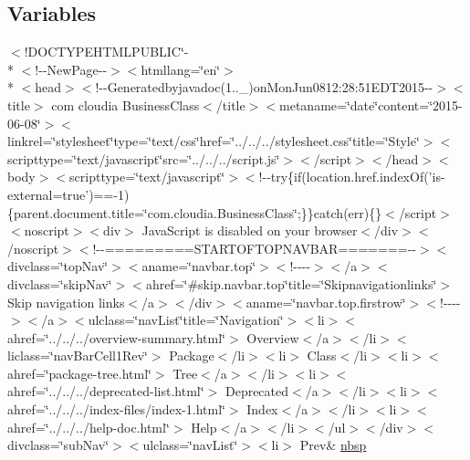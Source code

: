 \subsection*{Variables}
\begin{DoxyCompactItemize}
\item 
$<$!D\-O\-C\-T\-Y\-P\-E\-H\-T\-M\-L\-P\-U\-B\-L\-I\-C\char`\"{}-\/\\*
$<$!-\/-\/New\-Page-\/-\/$>$$<$htmllang=\char`\"{}en\char`\"{}$>$\\*
$<$head$>$$<$!-\/-\/Generatedbyjavadoc(1..\-\_)on\-Mon\-Jun0812\-:28\-:51\-E\-D\-T2015-\/-\/$>$$<$title$>$ com cloudia Business\-Class$<$/title$>$$<$metaname=\char`\"{}date\char`\"{}content=\char`\"{}2015-\/06-\/08\char`\"{}$>$$<$linkrel=\char`\"{}stylesheet\char`\"{}type=\char`\"{}text/css\char`\"{}href=\char`\"{}../../../stylesheet.\-css\char`\"{}title=\char`\"{}\-Style\char`\"{}$>$$<$scripttype=\char`\"{}text/javascript\char`\"{}src=\char`\"{}../../../script.\-js\char`\"{}$>$$<$/script$>$$<$/head$>$$<$body$>$$<$scripttype=\char`\"{}text/javascript\char`\"{}$>$$<$!-\/-\/try\{if(location.\-href.\-index\-Of('is-\/external=true')==-\/1)\{parent.\-document.\-title=\char`\"{}com.\-cloudia.\-Business\-Class\char`\"{};\}\}catch(err)\{\}$<$/script$>$$<$noscript$>$$<$div$>$ Java\-Script is disabled on your browser$<$/div$>$$<$/noscript$>$$<$!-\/-\/=========\-S\-T\-A\-R\-T\-O\-F\-T\-O\-P\-N\-A\-V\-B\-A\-R=======-\/-\/$>$$<$divclass=\char`\"{}top\-Nav\char`\"{}$>$$<$aname=\char`\"{}navbar.\-top\char`\"{}$>$$<$!-\/-\/-\/-\/$>$$<$/a$>$$<$divclass=\char`\"{}skip\-Nav\char`\"{}$>$$<$ahref=\char`\"{}\#skip.\-navbar.\-top\char`\"{}title=\char`\"{}\-Skipnavigationlinks\char`\"{}$>$ Skip navigation links$<$/a$>$$<$/div$>$$<$aname=\char`\"{}navbar.\-top.\-firstrow\char`\"{}$>$$<$!-\/-\/-\/-\/$>$$<$/a$>$$<$ulclass=\char`\"{}nav\-List\char`\"{}title=\char`\"{}\-Navigation\char`\"{}$>$$<$li$>$$<$ahref=\char`\"{}../../../overview-\/summary.\-html\char`\"{}$>$ Overview$<$/a$>$$<$/li$>$$<$liclass=\char`\"{}nav\-Bar\-Cell1\-Rev\char`\"{}$>$ Package$<$/li$>$$<$li$>$ Class$<$/li$>$$<$li$>$$<$ahref=\char`\"{}package-\/tree.\-html\char`\"{}$>$ Tree$<$/a$>$$<$/li$>$$<$li$>$$<$ahref=\char`\"{}../../../deprecated-\/list.\-html\char`\"{}$>$ Deprecated$<$/a$>$$<$/li$>$$<$li$>$$<$ahref=\char`\"{}../../../index-\/files/index-\/1.\-html\char`\"{}$>$ Index$<$/a$>$$<$/li$>$$<$li$>$$<$ahref=\char`\"{}../../../help-\/doc.\-html\char`\"{}$>$ Help$<$/a$>$$<$/li$>$$<$/ul$>$$<$/div$>$$<$divclass=\char`\"{}sub\-Nav\char`\"{}$>$$<$ulclass=\char`\"{}nav\-List\char`\"{}$>$$<$li$>$ Prev\& \hyperlink{com_2cloudia_2_business_class_2package-summary_8html_aff329d23a24e17d925e4078265e1c7cf}{nbsp}
\end{DoxyCompactItemize}



